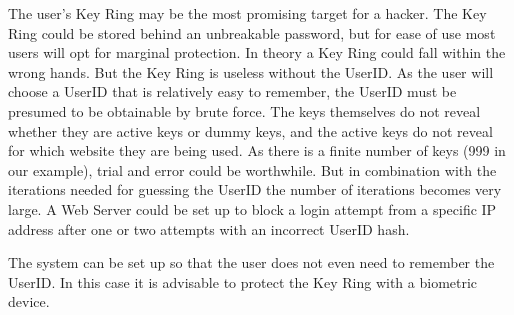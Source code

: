 \par
The user's Key Ring may be the most promising target for a hacker.
The Key Ring could be stored behind an unbreakable password, but for ease of use most users will opt for marginal protection.
In theory a Key Ring could fall within the wrong hands.
But the Key Ring is useless without the UserID.
As the user will choose a UserID that is relatively easy to remember, the UserID must be presumed to be obtainable by brute force.
The keys themselves do not reveal whether they are active keys or dummy keys, and the active keys do not reveal for which website they are being used.
As there is a finite number of keys (999 in our example), trial and error could be worthwhile.
But in combination with the iterations needed for guessing the UserID the number of iterations becomes very large.
A Web Server could be set up to block a login attempt from a specific IP address after one or two attempts with an incorrect UserID hash.
\par
The system can be set up so that the user does not even need to remember the UserID.
In this case it is advisable to protect the Key Ring with a biometric device.
